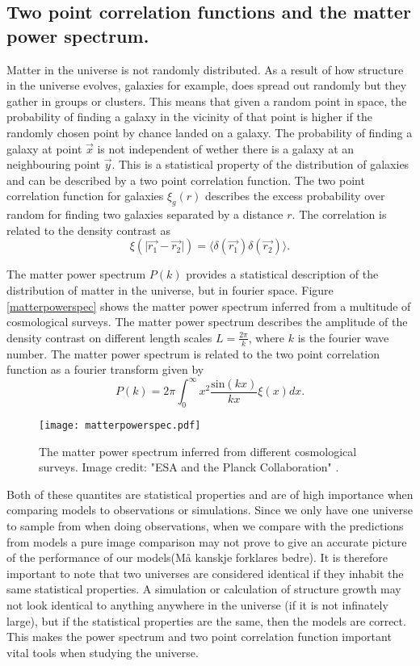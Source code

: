 \subsection{Two point correlation functions and the matter power spectrum.} \label{sec:corrtheory}
Matter in the universe is not randomly distributed. As a result of how structure in the universe evolves, galaxies for example,
does spread out randomly but they gather in groups or clusters. This means that given a random point in space, the probability of finding
a galaxy in the vicinity of that point is higher if the randomly chosen point by chance landed on a galaxy. The probability of finding a galaxy
at point $\vec{x}$ is not independent of wether there is a galaxy at an neighbouring point $\vec{y}$. This is a statistical property of the distribution
of galaxies and can be described by a two point correlation function. The two point correlation function for galaxies $\xi_{g}(r)$ describes the excess probability
over random for finding two galaxies separated by a distance $r$. The correlation is related to the density contrast as
\begin{equation}
    \xi(\vert\vec{r_1}-\vec{r_2}\vert)=\langle\delta(\vec{r_1})\delta(\vec{r_2})\rangle.
\end{equation}

The matter power spectrum $P(k)$ provides a statistical description of the
distribution of matter in the universe, but in fourier space. Figure
\ref{matterpowerspec} shows the matter power spectrum inferred from a multitude
of cosmological surveys. The matter power spectrum describes the amplitude of 
the density contrast on different length scales $L=\frac{2\pi}{k}$, where $k$ is
the fourier wave number. The matter power spectrum is related to the two point
correlation function as a fourier transform given by
\begin{equation}
    P(k)=2\pi\int_0^\infty x^2\frac{\mathrm{sin}(kx)}{kx}\xi(x)dx.
\end{equation}
\begin{figure}[htbp]\label{fig:matterpowerspec}
    \texttt{[image: matterpowerspec.pdf]}
    \caption{The matter power spectrum inferred from different cosmological surveys. Image credit: "ESA and the Planck Collaboration" \cite{2020}.}
\end{figure}
Both of these quantites are statistical properties and are of high importance
when comparing models to observations or simulations. Since we only have one
universe to sample from when doing observations, when we compare with the
predictions from models a pure image comparison may not prove to give an
accurate picture of the performance of our models(Må kanskje forklares bedre). It is therefore important to
note that two universes are considered identical if they inhabit the same
statistical properties. A simulation or calculation of structure growth may
not look identical to anything anywhere in the universe (if it is not infinately
large), but if the statistical properties are the same, then the models are
correct. This makes the power spectrum and two point correlation function
important vital tools when studying the universe.

